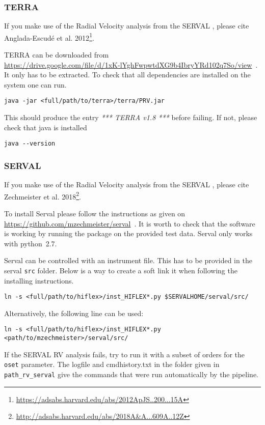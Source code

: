 \documentclass[10pt,a4paper]{article}
\begin{document}
\subsubsection{TERRA}
If you make use of the Radial Velocity analysis from the SERVAL , please cite Anglada-Escud{\'e} et al. 2012\footnote{\url{https://adsabs.harvard.edu/abs/2012ApJS..200...15A}}.

TERRA can be downloaded from\\ \url{https://drive.google.com/file/d/1xK-lYghFwpwtdXG9b4IbryYRd102q7So/view}~. It only has to be extracted. To check that all dependencies are installed on the system one can run.
\begin{lstlisting}[style=base]
java -jar <full/path/to/terra>/terra/PRV.jar
\end{lstlisting}
This should produce the entry \textit{*** TERRA v1.8 ***} before failing. If not, please check that java is installed
\begin{lstlisting}[style=base]
java --version
\end{lstlisting}

\subsubsection{SERVAL}
\label{Section:serval_package}
If you make use of the Radial Velocity analysis from the SERVAL , please cite Zechmeister et al. 2018\footnote{\url{http://adsabs.harvard.edu/abs/2018A&A...609A..12Z}}.

To install Serval please follow the instructions as given on\\ \url{https://github.com/mzechmeister/serval}~. It is worth to check that the software is working by running the package on the provided test data. Serval only works with python~2.7.

Serval can be controlled with an instrument file. This has to be provided in the serval \verb|src| folder. Below is a way to create a soft link it when following the installing instructions.
\begin{lstlisting}[style=base]
ln -s <full/path/to/hiflex>/inst_HIFLEX*.py $SERVALHOME/serval/src/
\end{lstlisting}
Alternatively, the following line can be used:
\begin{lstlisting}[style=base]
ln -s <full/path/to/hiflex>/inst_HIFLEX*.py <path/to/mzechmeister>/serval/src/
\end{lstlisting}

If the SERVAL RV analysis fails, try to run it with a subset of orders for the \verb|oset| parameter. The logfile and cmdhistory.txt in the folder given in \verb|path_rv_serval| give the commands that were run automatically by the pipeline.
\end{document}
